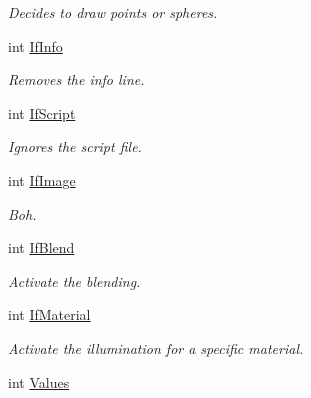 \begin{DoxyCompactItemize}
\begin{DoxyCompactList}\small\item\em Decides to draw points or spheres. \end{DoxyCompactList}\item 
int \hyperlink{classDraw_a068515d973f897b4d629594f8a30aa3a}{If\+Info}\hypertarget{classDraw_a068515d973f897b4d629594f8a30aa3a}{}\label{classDraw_a068515d973f897b4d629594f8a30aa3a}

\begin{DoxyCompactList}\small\item\em Removes the info line. \end{DoxyCompactList}\item 
int \hyperlink{classDraw_af08a6e98855e453a79f375df01cf15c4}{If\+Script}\hypertarget{classDraw_af08a6e98855e453a79f375df01cf15c4}{}\label{classDraw_af08a6e98855e453a79f375df01cf15c4}

\begin{DoxyCompactList}\small\item\em Ignores the script file. \end{DoxyCompactList}\item 
int \hyperlink{classDraw_ab7c162bdd1aa006017f7e85f0b68ad22}{If\+Image}\hypertarget{classDraw_ab7c162bdd1aa006017f7e85f0b68ad22}{}\label{classDraw_ab7c162bdd1aa006017f7e85f0b68ad22}

\begin{DoxyCompactList}\small\item\em Boh. \end{DoxyCompactList}\item 
int \hyperlink{classDraw_a03b1ef931447021cebcff5286c6a3783}{If\+Blend}\hypertarget{classDraw_a03b1ef931447021cebcff5286c6a3783}{}\label{classDraw_a03b1ef931447021cebcff5286c6a3783}

\begin{DoxyCompactList}\small\item\em Activate the blending. \end{DoxyCompactList}\item 
int \hyperlink{classDraw_a2e742183addcbbee8c3d478448355b43}{If\+Material}\hypertarget{classDraw_a2e742183addcbbee8c3d478448355b43}{}\label{classDraw_a2e742183addcbbee8c3d478448355b43}

\begin{DoxyCompactList}\small\item\em Activate the illumination for a specific material. \end{DoxyCompactList}\item 
int \hyperlink{classDraw_adf7d4e65efeb69a8ebbbb3cabbc39eae}{Values}\hypertarget{classDraw_adf7d4e65efeb69a8ebbbb3cabbc39eae}{}\label{classDraw_adf7d4e65efeb69a8ebbbb3cabbc39eae}


\end{DoxyCompactItemize}
